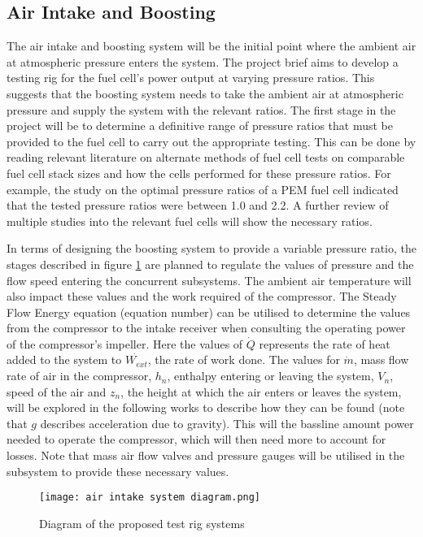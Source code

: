 \documentclass[a4paper,11pt]{article}
\begin{document}
\subsection{Air Intake and Boosting}
The air intake and boosting system will be the initial point where the ambient air at atmospheric pressure enters the system. The project brief aims to develop a testing rig for the fuel cell’s power output at varying pressure ratios. This suggests that the boosting system needs to take the ambient air at atmospheric pressure and supply the system with the relevant ratios. The first stage in the project will be to determine a definitive range of pressure ratios that must be provided to the fuel cell to carry out the appropriate testing. This can be done by reading relevant literature on alternate methods of fuel cell tests on comparable fuel cell stack sizes and how the cells performed for these pressure ratios. For example, the study on the optimal pressure ratios of a PEM fuel cell\cite{hoeflinger2020air} indicated that the tested pressure ratios were between 1.0 and 2.2. A further review of multiple studies into the relevant fuel cells will show the necessary ratios.

In terms of designing the boosting system to provide a variable pressure ratio, the stages described in figure \ref{fig:airIntakeSys} are planned to regulate the values of pressure and the flow speed entering the concurrent subsystems. The ambient air temperature will also impact these values and the work required of the compressor. The Steady Flow Energy equation (equation number) can be utilised to determine the values from the compressor to the intake receiver when consulting the operating power of the compressor’s impeller. Here the values of $\dot{Q}$ represents the rate of heat added to the system to $\dot{W_{ext}}$, the rate of work done. The values for $\dot{m}$, mass flow rate of air in the compressor, $h_n$, enthalpy entering or leaving the system, $V_n$, speed of the air and $z_n$, the height at which the air enters or leaves the system, will be explored in the following works to describe how they can be found (note that $g$ describes acceleration due to gravity). This will the bassline amount power needed to operate the compressor, which will then need more to account for losses. Note that mass air flow valves and pressure gauges will be utilised in the subsystem to provide these necessary values. 

\begin{figure}[h!] \label{fig:airIntakeSys}
    \texttt{[image: air intake system diagram.png]}
    \caption{Diagram of the proposed test rig systems}
    \centering  
\end{figure}
\end{document}
